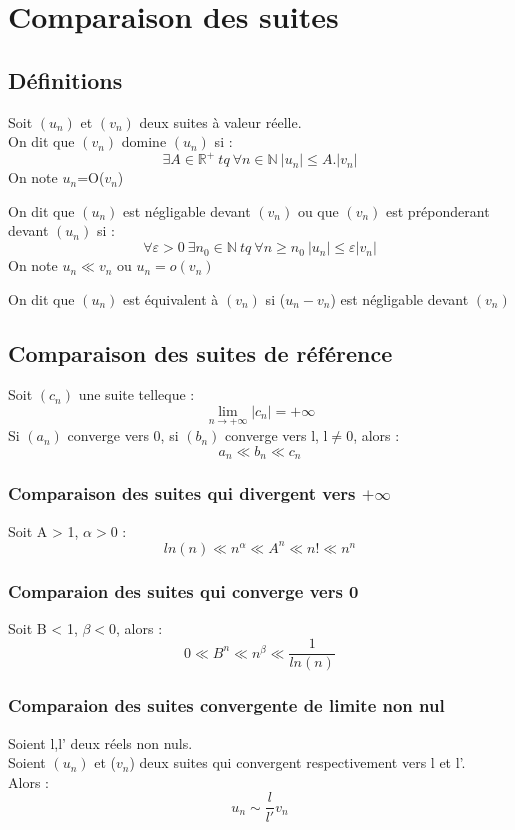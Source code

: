 \section{Comparaison des suites}
\subsection{Définitions}
\begin{de}
Soit $(u_n)$ et $(v_n)$ deux suites à valeur réelle.\\
On dit que $(v_n)$ domine $(u_n)$ si :
$$\exists A \in \mathbb{R}^{+}~ tq~ \forall n \in \mathbb{N}~ |u_n| \leq A.|v_n|$$
On note $u_n$=O($v_n$)
\end{de}
\begin{de}
On dit que $(u_n)$ est négligable devant $(v_n)$ ou que $(v_n)$ est préponderant devant $(u_n)$ si : 
$$\forall \varepsilon > 0~ \exists n_0 \in \mathbb{N}~ tq~ \forall n \geq n_0~ |u_n|\leq \varepsilon|v_n|$$
On note $u_n \ll v_n$ ou $u_n = o(v_n)$
\end{de}
\begin{de}
On dit que $(u_n)$ est équivalent à $(v_n)$ si ($u_n - v_n$) est négligable devant $(v_n)$
\end{de}
\subsection{Comparaison des suites de référence}
\begin{prop}
Soit $(c_n)$ une suite telleque :
$$\lim_{n \rightarrow +\infty}|c_n| = +\infty$$
Si $(a_n)$ converge vers 0, si $(b_n)$ converge vers l, l$\neq 0$, alors :
$$a_n \ll b_n \ll c_n$$
\end{prop}
\subsubsection{Comparaison des suites qui divergent vers $+\infty$}
Soit A > 1, $\alpha > 0$ :
$$ln(n) \ll n^{\alpha} \ll A^n \ll n! \ll n^n$$
\subsubsection{Comparaion des suites qui converge vers 0}
Soit B < 1, $\beta < 0$, alors :
$$0 \ll B^n \ll n^{\beta} \ll \dfrac{1}{ln(n)}$$
\subsubsection{Comparaion des suites convergente de limite non nul}
Soient l,l' deux réels non nuls.\\
Soient $(u_n)$ et ($v_n$) deux suites qui convergent respectivement vers l et l'.\\
Alors :
$$u_n \sim \dfrac{l}{l'}v_n$$
